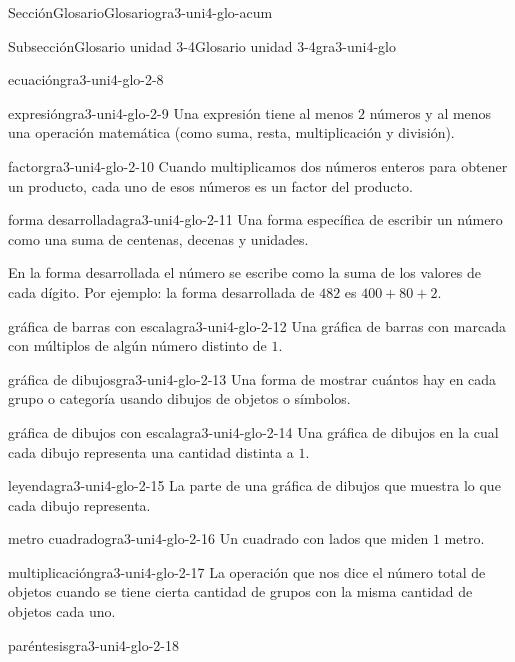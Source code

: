 \begin{sectionptx}{Sección}{Glosario}{}{Glosario}{}{}{gra3-uni4-glo-acum}
\begin{subsectionptx}{Subsección}{Glosario unidad 3-4}{}{Glosario unidad 3-4}{}{}{gra3-uni4-glo}
\begin{descriptionlist}
\begin{dlimedium}{ecuación}{gra3-uni4-glo-2-8}
\end{dlimedium}%
\begin{dlimedium}{expresión}{gra3-uni4-glo-2-9}%
Una expresión tiene al menos \(2\) números y al menos una operación matemática (como suma, resta, multiplicación y división).%
\end{dlimedium}%
\begin{dlimedium}{factor}{gra3-uni4-glo-2-10}%
Cuando multiplicamos dos números enteros para obtener un producto, cada uno de esos números es un factor del producto.%
\end{dlimedium}%
\begin{dlimedium}{forma desarrollada}{gra3-uni4-glo-2-11}%
Una forma específica de escribir un número como una suma de centenas, decenas y unidades.%
\par
En la forma desarrollada el número se escribe como la suma de los valores de cada dígito. Por ejemplo: la forma desarrollada de \(482\) es \(400 + 80 + 2\).%
\end{dlimedium}%
\begin{dlimedium}{gráfica de barras con escala}{gra3-uni4-glo-2-12}%
Una gráfica de barras con marcada con múltiplos de algún número distinto de \(1\).%
\end{dlimedium}%
\begin{dlimedium}{gráfica de dibujos}{gra3-uni4-glo-2-13}%
Una forma de mostrar cuántos hay en cada grupo o categoría usando dibujos de objetos o símbolos.%
\end{dlimedium}%
\begin{dlimedium}{gráfica de dibujos con escala}{gra3-uni4-glo-2-14}%
Una gráfica de dibujos en la cual cada dibujo representa una cantidad distinta a \(1\).%
\end{dlimedium}%
\begin{dlimedium}{leyenda}{gra3-uni4-glo-2-15}%
La parte de una gráfica de dibujos que muestra lo que cada dibujo representa.%
\end{dlimedium}%
\begin{dlimedium}{metro cuadrado}{gra3-uni4-glo-2-16}%
Un cuadrado con lados que miden \(1\) metro.%
\end{dlimedium}%
\begin{dlimedium}{multiplicación}{gra3-uni4-glo-2-17}%
La operación que nos dice el número total de objetos cuando se tiene cierta cantidad de grupos con la misma cantidad de objetos cada uno.%
\end{dlimedium}%
\begin{dlimedium}{paréntesis}{gra3-uni4-glo-2-18}%

\end{dlimedium}
\end{descriptionlist}
\end{subsectionptx}
\end{sectionptx}
